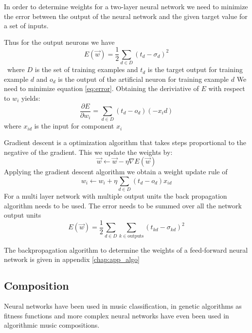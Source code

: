 In order to determine weights for a two-layer neural network we need to minimize the error between the output of the neural network and the given target value for a set of inputs. 

Thus for the output neurons we have
\begin{equation} E(\vec{w}) = \frac{1}{2} \sum_{d \in D}(t_d - \sigma_d)^2 \label{eq:error} \end{equation}\
where $D$ is the set of training examples and $t_d$ is the target output for training example $d$ and $o_d$ is the output of the artificial neuron for training example $d$
We need to minimize equation \ref{eq:error}.
Obtaining the deriviative of $E$ with respect to $w_i$ yields:
\[ \frac{\partial E}{\partial w_i} = \sum_{d\in D}(t_d - o_d)(-x_id) \]
where $x_{id}$ is the input for component $x_i$

Gradient descent is a optimization algorithm that takes steps proportional to the negative of the gradient. This we update the weights by:
\[\vec{w} \leftarrow \vec{w} - \eta \nabla E(\vec{w}) \]
Applying the gradient descent algorithm we obtain a weight update rule of
\[ w_i \leftarrow w_i + \eta \sum_{d \in D} (t_d - o_d) x_{id} \]
For a multi layer network with multiple output units the back propagation algorithm needs to be used.
The error needs to be summed over all the network output units
\[E(\vec{w}) = \frac{1}{2} \sum_{d \in D} \sum_{k \in \text{outputs}} (t_{kd} - \sigma_{kd})^2 \]

The backpropagation algorithm to determine the weights of a feed-forward neural network is given in appendix \ref{chap:app_algo}


\subsection{Composition}
Neural networks have been used in music classification, in genetic algorithms as fitness functions and more complex neural networks have even been used in algorithmic music compositions.


